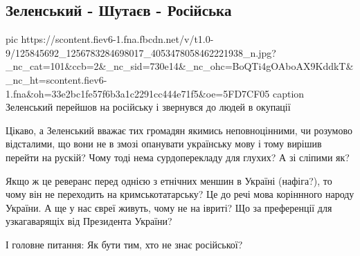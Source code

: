  
 
 

\subsection{Зеленський - Шутаєв - Російська}
\label{sec:16_11_2020.fb.dmytry_shutaiev.1.zelja_rus_people}

\ifcmt
pic https://scontent.fiev6-1.fna.fbcdn.net/v/t1.0-9/125845692_1256783284698017_4053478058462221938_n.jpg?_nc_cat=101&ccb=2&_nc_sid=730e14&_nc_ohc=BoQTi4gOAboAX9KddkT&_nc_ht=scontent.fiev6-1.fna&oh=33e2bc1fe57f6b3a1c2291cc444e71f5&oe=5FD7CF05
caption Зеленський перейшов на російську і звернувся до людей в окупації
\fi

Цікаво, а Зеленський вважає тих громадян якимись неповноцінними, чи розумово
відсталими, що вони не в змозі опанувати українську мову і тому вирішив перейти
на рускій? Чому тоді нема сурдоперекладу для глухих? А зі сліпими як? 

Якщо ж це реверанс перед однією з етнічних меншин в Україні (нафіга?), то чому
він не переходить на кримськотатарську? Це до речі мова коріннного народу
України. А ще у нас євреї живуть, чому не на івриті? Що за преференції для
узкагаварящіх від Президента України? 

І головне питання: Як бути тим, хто не знає російської?

